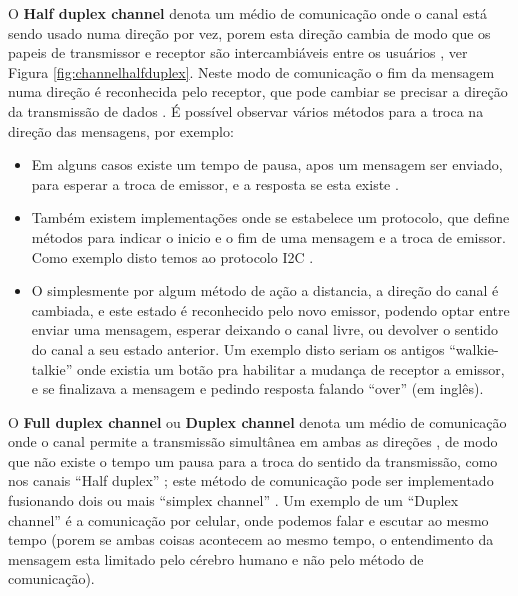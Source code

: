 \documentclass[a4paper,10pt]{article}
\begin{document}
O \textbf{Half duplex channel} denota um médio de comunicação onde o canal está
sendo usado numa direção por vez, 
porem esta direção cambia de modo que os papeis de transmissor e receptor são 
intercambiáveis entre os usuários 
\cite[pp. 5]{shinde2009computer}\cite[pp. 208]{sawaya2002dicionario}, ver Figura \ref{fig:channelhalfduplex}. 
Neste modo de comunicação o fim da mensagem numa direção é 
reconhecida pelo receptor, que pode cambiar se precisar a direção da transmissão de dados \cite[pp. 60]{hura2001data}.
É possível observar vários métodos para a troca na direção das mensagens, por exemplo:
\begin{itemize}
\item Em alguns casos existe um tempo de pausa, apos um mensagem ser enviado, 
para esperar a troca de emissor, e a resposta se esta existe \cite[pp. 60]{hura2001data}.
\item Também existem implementações onde se estabelece um protocolo, que define 
métodos para indicar o inicio e o fim de uma mensagem e a troca de emissor. 
Como exemplo disto temos ao protocolo I2C \cite[pp. 82]{gupta2019iot}.
\item O simplesmente por algum método de ação a distancia, 
a direção do canal é cambiada, e este estado é reconhecido pelo novo emissor, 
podendo optar entre enviar uma mensagem, esperar deixando o canal livre, 
ou devolver o sentido do canal a seu estado anterior.
Um exemplo disto seriam os antigos ``walkie-talkie'' onde existia um botão
pra habilitar a mudança de receptor a emissor, e se finalizava a mensagem e pedindo resposta
falando ``over'' (em inglês).

\end{itemize}


O \textbf{Full duplex channel} ou  \textbf{Duplex channel} denota um médio de comunicação onde o
canal permite a transmissão simultânea em ambas as direções \cite[pp. 150]{sawaya2002dicionario},
de modo que não existe o tempo um pausa para a troca do sentido da transmissão, 
como nos canais ``Half duplex'' \cite[pp. 5]{shinde2009computer};
este método de comunicação pode ser implementado fusionando dois ou mais ``simplex channel'' \cite[pp. 60]{hura2001data}.
Um exemplo de um ``Duplex channel'' é a comunicação por celular, 
onde podemos falar e escutar ao mesmo tempo (porem se ambas coisas acontecem ao mesmo tempo, 
o entendimento da mensagem esta limitado pelo cérebro humano e não pelo método de comunicação).
\end{document}
